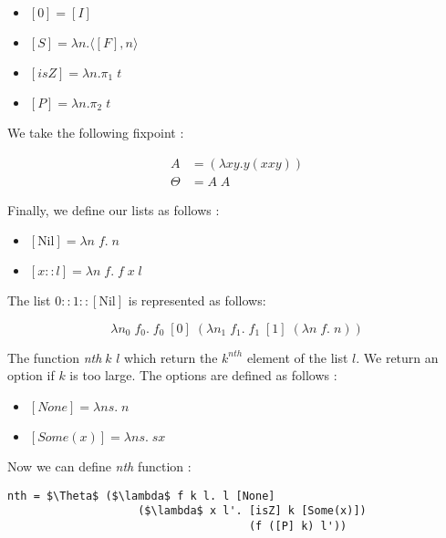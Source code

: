 \documentclass{article}
\theoremstyle{plain}
\newcommand{\nil}{[\text{Nil}]}
\newcommand{\nth}{\textit{nth}}
\begin{document}
  \begin{multicols}{2}
    \begin{itemize}
      \item $[0] = [I]$
      \item $[S] = \lambda n. \langle [F], n\rangle$
      \item $[\textit{isZ}] = \lambda n. \pi_1\;t$
      \item $[P] = \lambda n. \pi_2\;t$
    \end{itemize}
  \end{multicols}

  We take the following fixpoint :

  \begin{align*}
    A &= (\lambda xy.y(xxy)) \\
    \Theta &= A\;A
  \end{align*}

  Finally, we define our lists as follows :

  \begin{itemize}
    \item $\nil = \lambda n\;f.\; n$
    \item $[x :: l] = \lambda n\;f.\; f\; x\; l$
  \end{itemize}

  \begin{center}
    The list $0 :: 1 :: \nil$ is represented as follows:
  \end{center}
  $$\lambda n_0\; f_0.\; f_0\; [0]\; (\lambda n_1\;f_1.\; f_1\;[1]\;(\lambda
  n\;f.\;n))$$

  The function \nth $\;k$ $l$ which return the
  $k^{nth}$ element of the list $l$. We return an option if $k$ is too large.
  The options are defined as follows :

  \begin{itemize}
    \item $[\textit{None}] = \lambda n s.\;n$
    \item $[\textit{Some}(x)] = \lambda n s.\;s x$
  \end{itemize}

  Now we can define \textit{nth} function :

    \begin{lstlisting}[caption=Nth function on list, mathescape=true]
nth = $\Theta$ ($\lambda$ f k l. l [None]
                    ($\lambda$ x l'. [isZ] k [Some(x)])
                                     (f ([P] k) l'))
    \end{lstlisting}
\end{document}
